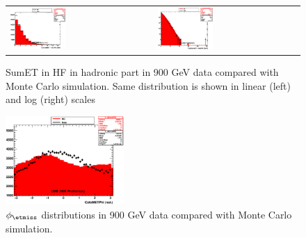 \begin{figure}[h!]
 \centering
 \begin{tabular}{ll}
  \includegraphics[width=0.40\textwidth]{plots_DataVsMC_MB_900GeV/h_caloSumetHadHF_lin.eps} &
  \includegraphics[width=0.40\textwidth]{plots_DataVsMC_MB_900GeV/h_caloSumetHadHF.eps} \\
 \end{tabular}
\caption{SumET in HF in hadronic part in 900 GeV data compared
   with Monte Carlo simulation. Same distribution is shown in linear (left) and log (right) scales
          \label{fig:DataVsMC_MB_900_10}}
\end{figure}

\begin{figure}[h!]
 \centering
  \includegraphics[width=0.40\textwidth]{plots_DataVsMC_MB_900GeV/h_calometPhi.eps}
 \caption{$\phi_{\etmiss}$ distributions in 900 GeV data compared
   with Monte Carlo simulation.
          \label{fig:DataVsMC_MB_900_11}}
\end{figure}

